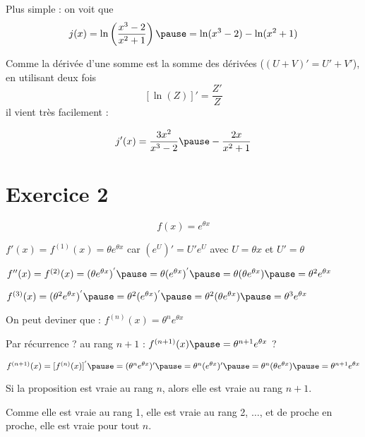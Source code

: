 \documentclass[9pt,handout,professionalfonts,hyperref]{beamer}
\begin{document}
\begin{frame}
Plus simple : on voit que $$j(x)=\ln\left(\dfrac{x^3-2}{x^2+1}\right)\pause=\ln(x^3-2)-\ln(x^2+1)$$
 \pause
\medskip

Comme la dérivée d'une somme est la somme des dérivées ($(U+V)' = U'+V'$), en utilisant deux fois $$[\ln(Z)]'=\frac{Z'}{Z}$$ il vient très facilement :

$$
j'(x)=\frac{3x^2}{x^3-2}\pause -\frac{2x}{x^2+1}
$$
\end{frame}

\section{Exercice 2}

\begin{frame}

$$f(x)=e^{\theta x}$$
\pause

$f'(x)=f^{(1)}(x)=\theta e^{\theta x}$ \pause car $(e^U)'=U'e^U$ \pause avec $U=\theta x$ \pause et $U'=\theta$
\pause
\medskip

$f''(x)=f^{(2)}(x)=(\theta e^{\theta x})^{'}\pause =\theta(e^{\theta x})^{'} \pause =\theta (\theta e^{\theta x}) \pause = \theta^2 e^{\theta x}$
 \pause
\medskip

$f^{(3)}(x)=(\theta^2 e^{\theta x})^{'}\pause = \theta^2(e^{\theta x})^{'} \pause =\theta^2 (\theta e^{\theta x}) \pause =\theta^3 e^{\theta x}$
 \pause
\medskip

On peut deviner que : $f^{(n)}(x)=\theta^n e^{\theta x}$
 \pause
\medskip

Par récurrence ? \pause au rang $n+1$ : \pause \alert{$f^{(n+1)}(x)\pause =\theta^{n+1} e^{\theta x}$} ?
 \pause
\medskip

$f^{(n+1)}(x)=[f^{(n)}(x)]^{'}\pause =(\theta^n  e^{\theta x})'\pause =\theta^n  (e^{\theta x})'\pause =\theta^n (\theta e^{\theta x})\pause =\theta^{n+1} e^{\theta x} $\newline

Si la proposition est vraie au rang $n$, alors elle est vraie au rang $n+1$.

Comme elle est vraie au rang 1, elle est vraie au rang 2, $\dots$, et de proche en proche, elle est vraie pour tout $n$.

\end{frame}
\end{document}
